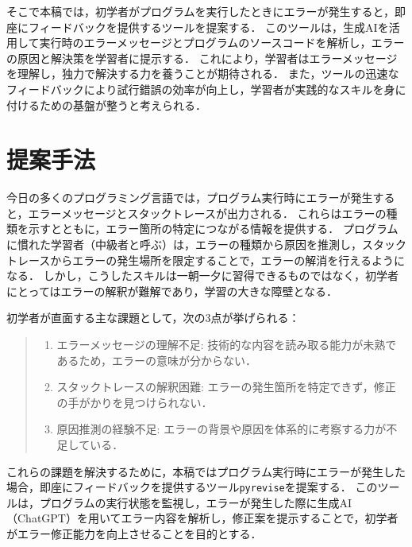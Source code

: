 \documentclass[12pt,twoside]{jbook}
\newcommand{\pyrevise}{\texttt{pyrevise}}
\begin{document}
そこで本稿では，初学者がプログラムを実行したときにエラーが発生すると，即座にフィードバックを提供するツールを提案する．
このツールは，生成AIを活用して実行時のエラーメッセージとプログラムのソースコードを解析し，エラーの原因と解決策を学習者に提示する\cite{2023jssst_tanaka}．
これにより，学習者はエラーメッセージを理解し，独力で解決する力を養うことが期待される．
また，ツールの迅速なフィードバックにより試行錯誤の効率が向上し，学習者が実践的なスキルを身に付けるための基盤が整うと考えられる．


\chapter{提案手法}\label{sect:requirements}
今日の多くのプログラミング言語では，プログラム実行時にエラーが発生すると，エラーメッセージとスタックトレースが出力される．
これらはエラーの種類を示すとともに，エラー箇所の特定につながる情報を提供する．
プログラムに慣れた学習者（中級者と呼ぶ）は，エラーの種類から原因を推測し，スタックトレースからエラーの発生場所を限定することで，エラーの解消を行えるようになる．
しかし，こうしたスキルは一朝一夕に習得できるものではなく，初学者にとってはエラーの解釈が難解であり，学習の大きな障壁となる\cite{2012ies_sakakibara}．

初学者が直面する主な課題として，次の3点が挙げられる：
\begin{quote}
	\begin{enumerate}
	 \item エラーメッセージの理解不足: 技術的な内容を読み取る能力が未熟であるため，エラーの意味が分からない．
	 \item スタックトレースの解釈困難: エラーの発生箇所を特定できず，修正の手がかりを見つけられない．
	 \item 原因推測の経験不足: エラーの背景や原因を体系的に考察する力が不足している．
	\end{enumerate}
\end{quote}
これらの課題を解決するために，本稿ではプログラム実行時にエラーが発生した場合，即座にフィードバックを提供するツール\pyrevise を提案する．
このツールは，プログラムの実行状態を監視し，エラーが発生した際に生成AI（ChatGPT）を用いてエラー内容を解析し，修正案を提示することで，初学者がエラー修正能力を向上させることを目的とする．
\end{document}
